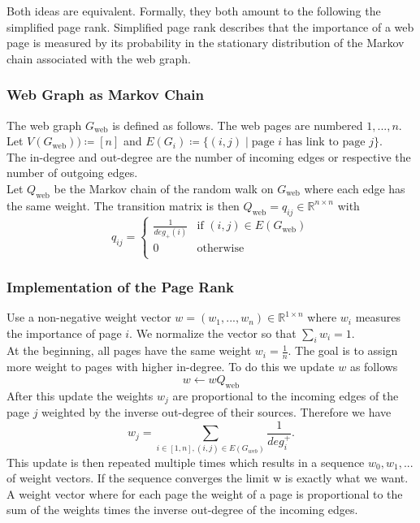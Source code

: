 \documentclass[english]{panikzettel}
\begin{document}
Both ideas are equivalent. Formally, they both amount to the following the simplified page rank. Simplified page rank describes that the importance of a web page is measured by its probability in the stationary distribution of the Markov chain associated with the web graph.

\subsubsection{Web Graph as Markov Chain}
The web graph $G_{\text{web}}$ is defined as follows. The web pages are numbered $1,...,n$. Let $V(G_{\text{web}}))\coloneqq [n]$ and $E(G_i)\coloneqq \{(i,j) \mid \text{page } i \text{ has link to page } j\}$.\\
The in-degree and out-degree are the number of incoming edges or respective the number of outgoing edges.\\
Let $Q_{\text{web}}$ be the Markov chain of the random walk on $G_{\text{web}}$ where each edge has the same weight. The transition matrix is then $Q_{\text{web}}=q_{ij}\in\mathbb{R}^{n\times n}$  with
\[
q_{ij}=
\begin{cases}
\frac{1}{deg_{+}(i)} & \text{if }(i,j)\in E(G_{\text{web}})  \\
0 & \text{otherwise} \\
\end{cases}
\]

\subsubsection{Implementation of the Page Rank}
Use a non-negative weight vector $w=(w_1,...,w_n)\in\mathbb{R}^{1\times n}$ where $w_i$ measures the importance of page $i$. We normalize the vector so that $\sum_i w_i =1$.\\
At the beginning, all pages have the same weight $w_i=\frac{1}{n}$. The goal is to assign more weight to pages with higher in-degree. To do this we update $w$ as follows
\[
w \leftarrow wQ_{\text{web}}
\]
After this update the weights $w_j$ are proportional to the incoming edges of the page $j$ weighted by the inverse out-degree of their sources. Therefore we have
\[
w_j=\sum_{i\in [1,n], (i,j)\in E(G_{web})}\frac{1}{deg^{+}_i}.
\]
This update is then repeated multiple times which results in a sequence $w_0,w_1,...$ of weight vectors. If the sequence converges the limit w is exactly what we want. A weight vector where for each page the weight of a page is proportional to the sum of the weights times the inverse out-degree of the incoming edges.
\end{document}
